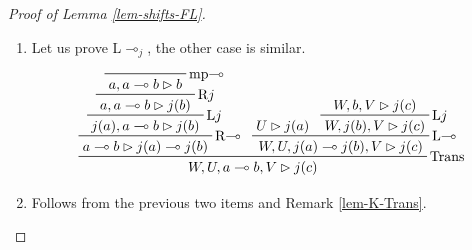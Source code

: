 \documentclass[runningheads]{llncs}
\begin{document}
\begin{proof}[Proof of Lemma \ref{lem-shifts-FL}]
\begin{enumerate}
    \begin{adjustbox}{max width=.95\textwidth}
    \end{adjustbox}
    
    where steps $(*)$ and $(**)$ correspond to several subsequent applications of R$\cdot$ and L$\cdot$, respectively, and are straightforwardly provable by induction.
    \item Let us prove L$\multimap_{j}$, the other case is similar.
    \[
    \prftree[r]{Trans}{
        \prftree[r]{\textnormal{R$\multimap$}}{
            \prftree[r]{\textnormal{L$j$}}{
                \prftree[r]{\textnormal{R$j$}}{\prftree[r]{\textnormal{mp$\multimap$}}{a,a\multimap b\rhd b}}{a,a\multimap b\rhd j(b)}
            }{j(a),a\multimap b\rhd j(b)}
        }{a\multimap b\rhd j(a)\multimap j(b)}
    }{
        \prftree[r]{\textnormal{L$\multimap$}}{
            {U\rhd j(a)}
        }{
            \prftree[r]{\textnormal{L$j$}}{
                {W,b,V\rhd j(c)}
            }{W,j(b),V\rhd j(c)}
        }{W,U,j(a)\multimap j(b),V\rhd j(c)}
    }{W,U,a\multimap b,V\rhd j(c)}
    \]
    \item Follows from the previous two items and Remark \ref{lem-K-Trans}.
    \qedhere
\end{enumerate}
\end{proof}
\end{document}
